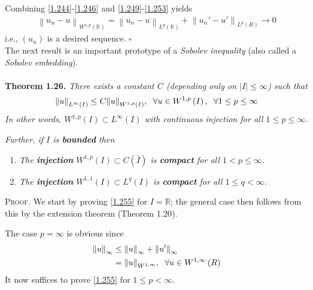 \documentclass[a4paper,oneside]{article}
\numberwithin{equation}{section}
\begin{document}
Combining \eqref{1.244}-\eqref{1.246} and \eqref{1.249}-\eqref{1.253} yields
\begin{align}
{\left\| {{u_n} - u} \right\|_{{W^{1,p}}\left( \mathbb{R} \right)}} = {\left\| {{u_n} - u} \right\|_{{L^p}\left( \mathbb{R} \right)}} + {\left\| {{u_n}' - u'} \right\|_{{L^p}\left( R \right)}} \to 0
\end{align}
i.e., $\left(u_n\right)$ is a desired sequence. \hfill $\square$\\

The next result is an important prototype of a \textit{Sobolev inequality} (also called a \textit{Sobolev embedding}).\\
\\
\textbf{Theorem 1.26.} \textit{There exists a constant $C$ (depending only on $\left| I \right| \le \infty $) such that}
\begin{align}
\label{1.255}
{\left\| u \right\|_{{L^\infty }\left( I \right)}} \le C{\left\| u \right\|_{{W^{1,p}}\left( I \right)}},\hspace{0.2cm}\forall u \in {W^{1,p}}\left( I \right),\hspace{0.2cm}\forall 1 \le p \le \infty 
\end{align}
\textit{In other words, ${W^{1,p}}\left( I \right) \subset {L^\infty }\left( I \right)$ with continuous injection for all $1\le p\le \infty$.}

\textit{Further, if $I$ is \textbf{bounded} then}
\begin{enumerate}
\item \textit{The \textbf{injection} ${W^{1,p}}\left( I \right) \subset C\left( {\bar I} \right)$ is \textbf{compact} for all $1<p\le \infty$.}
\item \textit{The \textbf{injection} ${W^{1,1}}\left( I \right) \subset {L^q}\left( I \right)$ is \textbf{compact} for all $1\le q< \infty$.}
\end{enumerate}
\textsc{Proof.} We start by proving \eqref{1.255} for $I=\mathbb{R}$; the general case then follows from this by the extension theorem (Theorem 1.20). 

The case $p=\infty$ is obvious since
\begin{align}
{\left\| u \right\|_\infty } &\le {\left\| u \right\|_\infty } + {\left\| {u'} \right\|_\infty }\\
 &= {\left\| u \right\|_{{W^{1,\infty }}}},\hspace{0.2cm}\forall u \in {W^{1,\infty }}\left( R \right)
\end{align}
It now suffices to prove \eqref{1.255} for $1\le p<\infty$.  
\end{document}

